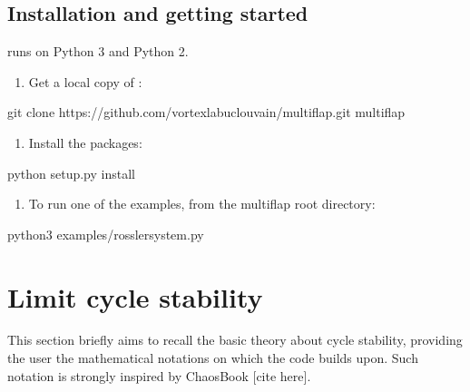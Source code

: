 \documentclass[letterpaper,10pt,english,openany,oneside]{sphinxmanual}
\begin{document}
\section{Installation and getting started}
\label{\detokenize{getting_started/multiflap_guide:installation-and-getting-started}}
 runs on Python 3 and Python 2.
\begin{enumerate}
%
\item {} 
Get a local copy of :

\end{enumerate}

\begin{sphinxVerbatim}[commandchars=\\\{\}]
\PYGZdl{} git clone https://github.com/vortexlab\PYGZhy{}uclouvain/multiflap.git   multiflap
\end{sphinxVerbatim}
\begin{enumerate}
%
\setcounter{enumi}{1}
\item {} 
Install the packages:

\end{enumerate}

\begin{sphinxVerbatim}[commandchars=\\\{\}]
\PYGZdl{} python setup.py install
\end{sphinxVerbatim}
\begin{enumerate}
%
\setcounter{enumi}{2}
\item {} 
To run one of the examples, from the multiflap root directory:

\end{enumerate}

\begin{sphinxVerbatim}[commandchars=\\\{\}]
\PYGZdl{} python3 examples/rossler\PYGZus{}system.py
\end{sphinxVerbatim}


\chapter{Limit cycle stability}
\label{\detokenize{limit_cycle_stability/index:limit-cycle-stability}}\label{\detokenize{limit_cycle_stability/index::doc}}
This section briefly aims to recall the basic theory about cycle stability, providing the user the mathematical notations on which the code builds upon.
Such notation is strongly inspired by ChaosBook {[}cite here{]}.
\end{document}
